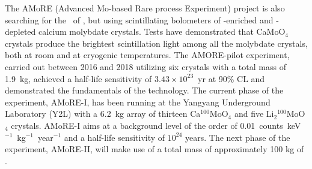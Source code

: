 The AMoRE \cite{Kim:2022uce} (Advanced Mo-based Rare process Experiment) project is also searching for the \bbonu\ of , but using scintillating bolometers of -enriched and -depleted calcium molybdate crystals. Tests have demonstrated that CaMoO$_4$ crystals produce the brightest scintillation light among all the molybdate crystals, both at room and at cryogenic temperatures. The AMORE-pilot experiment, carried out between 2016 and 2018 utilizing six crystals with a total mass of 1.9~kg, achieved a half-life sensitivity of $3.43\times10^{23}$~yr at 90\% CL and demonstrated the fundamentals of the technology. The current phase of the experiment, AMoRE-I, has been running at the Yangyang Underground Laboratory (Y2L) with a 6.2~kg array of thirteen Ca$^{100}$MoO$_4$ and five Li$_2$$^{100}$MoO$_4$ crystals. AMoRE-I aims at a background level of the order of 0.01~counts~keV$^{-1}$~kg$^{-1}$~year$^{-1}$ and a half-life sensitivity of $10^{24}$ years. The next phase of the experiment, AMoRE-II, will make use of a total mass of approximately 100 kg of .
